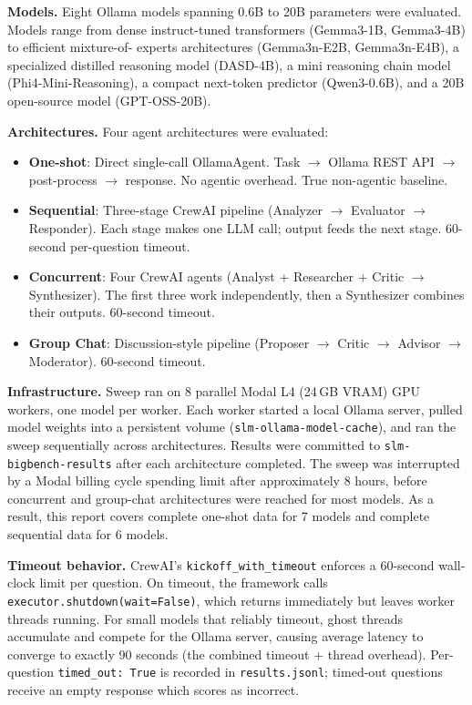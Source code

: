 \documentclass[11pt,letterpaper]{article}
\begin{document}
\textbf{Models.} Eight Ollama models spanning 0.6B to 20B parameters were evaluated. Models
range from dense instruct-tuned transformers (Gemma3-1B, Gemma3-4B) to efficient mixture-of-
experts architectures (Gemma3n-E2B, Gemma3n-E4B), a specialized distilled reasoning model
(DASD-4B), a mini reasoning chain model (Phi4-Mini-Reasoning), a compact next-token predictor
(Qwen3-0.6B), and a 20B open-source model (GPT-OSS-20B).

\textbf{Architectures.} Four agent architectures were evaluated:
\begin{itemize}
  \item \textbf{One-shot}: Direct single-call OllamaAgent. Task $\to$ Ollama REST API $\to$ post-process $\to$ response. No agentic overhead. True non-agentic baseline.
  \item \textbf{Sequential}: Three-stage CrewAI pipeline (Analyzer $\to$ Evaluator $\to$ Responder). Each stage makes one LLM call; output feeds the next stage. 60-second per-question timeout.
  \item \textbf{Concurrent}: Four CrewAI agents (Analyst + Researcher + Critic $\to$ Synthesizer). The first three work independently, then a Synthesizer combines their outputs. 60-second timeout.
  \item \textbf{Group Chat}: Discussion-style pipeline (Proposer $\to$ Critic $\to$ Advisor $\to$ Moderator). 60-second timeout.
\end{itemize}

\textbf{Infrastructure.} Sweep ran on 8 parallel Modal L4 (24\,GB VRAM) GPU workers, one model
per worker. Each worker started a local Ollama server, pulled model weights into a persistent
volume (\texttt{slm-ollama-model-cache}), and ran the sweep sequentially across architectures.
Results were committed to \texttt{slm-bigbench-results} after each architecture completed.
The sweep was interrupted by a Modal billing cycle spending limit after approximately 8 hours,
before concurrent and group-chat architectures were reached for most models. As a result,
this report covers complete one-shot data for 7 models and complete sequential data for 6 models.

\textbf{Timeout behavior.} CrewAI's \texttt{kickoff\_with\_timeout} enforces a 60-second wall-
clock limit per question. On timeout, the framework calls \texttt{executor.shutdown(wait=False)},
which returns immediately but leaves worker threads running. For small models that reliably
timeout, ghost threads accumulate and compete for the Ollama server, causing average latency to
converge to exactly 90 seconds (the combined timeout + thread overhead). Per-question \texttt
{timed\_out: True} is recorded in \texttt{results.jsonl}; timed-out questions receive an empty
response which scores as incorrect.
\end{document}
